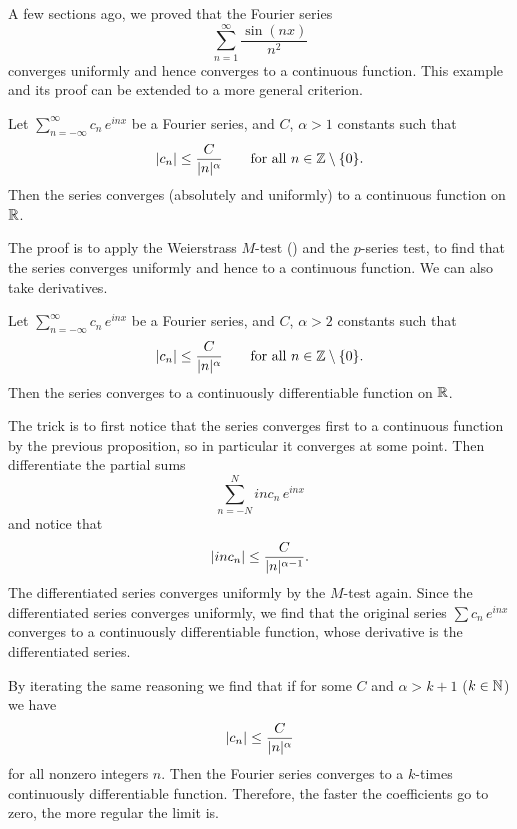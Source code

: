 A few sections ago, we proved that the Fourier series 
\begin{equation*}
\sum_{n=1}^\infty \frac{\sin(nx)}{n^2}
\end{equation*}
converges uniformly and hence converges to a continuous function.  This 
example and its proof can be extended to a more general criterion.

\begin{prop}
Let $\sum_{n=-\infty}^\infty c_n\, e^{inx}$ be a Fourier series,
and $C$, $\alpha > 1$ constants such that
\begin{equation*}
\lvert {c_n} \rvert \leq \frac{C}{\lvert {n} \rvert^\alpha}
\qquad \text{for all } n \in {\mathbb{Z}} \setminus \{ 0 \}.
\end{equation*}
Then the series converges (absolutely and uniformly) to a continuous function on ${\mathbb{R}}$.
\end{prop}

The proof is to apply the Weierstrass $M$-test () and
the $p$-series test, to find that the series converges uniformly and hence
to a continuous function.
We can also take derivatives.

\begin{prop}
Let $\sum_{n=-\infty}^\infty c_n\, e^{inx}$ be a Fourier series,
and $C$, $\alpha > 2$ constants such that
\begin{equation*}
\lvert {c_n} \rvert \leq \frac{C}{\lvert {n} \rvert^\alpha}
\qquad \text{for all } n \in {\mathbb{Z}} \setminus \{ 0 \}.
\end{equation*}
Then the series converges to a continuously differentiable function on ${\mathbb{R}}$.
\end{prop}

The trick is to first notice that the series converges first to a continuous
function by the previous proposition, so in particular it converges at some
point.  Then differentiate the partial sums
\begin{equation*}
\sum_{n=-N}^{N}
i n c_n \,e^{inx}
\end{equation*}
and notice that 
\begin{equation*}
\lvert {i n c_n} \rvert \leq \frac{C}{\lvert {n} \rvert^{\alpha-1}} .
\end{equation*}
The differentiated series converges uniformly by the $M$-test again.  Since
the differentiated series
converges uniformly, we find that the original series $\sum c_n\,e^{inx}$
converges 
to a continuously differentiable function, whose derivative is
the differentiated series.

By iterating the same reasoning we find that if
for some $C$ and $\alpha > k+1$ ($k \in {\mathbb{N}}$) we have
\begin{equation*}
\lvert {c_n} \rvert 
\leq \frac{C}{\lvert {n} \rvert^\alpha}
\end{equation*}
for all nonzero integers $n$.  Then 
the Fourier series converges to a $k$-times continuously differentiable
function.  Therefore, the faster the coefficients go to zero, the more
regular the limit is.

